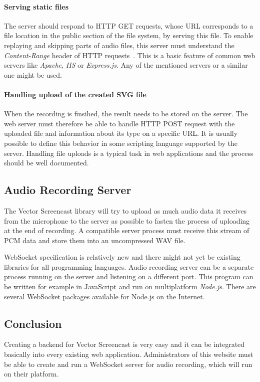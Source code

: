 \paragraph{Serving static files}
The server should respond to HTTP GET requests, whose URL corresponds to a file location in the public section of the file system, by serving this file. To enable replaying and skipping parts of audio files, this server must understand the \textit{Content-Range} header of HTTP requests~\cite{content_range}. This is a basic feature of common web servers like \textit{Apache}, \textit{IIS} or \textit{Express.js}. Any of the mentioned servers or a similar one might be used.

\paragraph{Handling upload of the created SVG file}
When the recording is finsihed, the result needs to be stored on the server. The web server must therefore be able to handle HTTP POST request with the uploaded file and information about its type on a specific URL. It is usually possible to define this behavior in some scripting language supported by the server. Handling file uploads is a typical task in web applications and the process should be well documented.

\subsection{Audio Recording Server}
The Vector Screencast library will try to upload as much audio data it receives from the microphone to the server as possible to fasten the process of uploading at the end of recording. A compatible server process must receive this stream of PCM data and store them into an uncompressed WAV file.

WebSocket specification is relatively new and there might not yet be existing libraries for all programming languages. Audio recording server can be a separate process running on the server and listening on a different port. This program can be written for example in JavaScript and run on multiplatform \textit{Node.js}. There are several WebSocket packages available for Node.js on the Internet.

\subsection{Conclusion}
Creating a backend for Vector Screencast is very easy and it can be integrated basically into every existing web application. Administrators of this website must be able to create and run a WebSocket server for audio recording, which will run on their platform.
